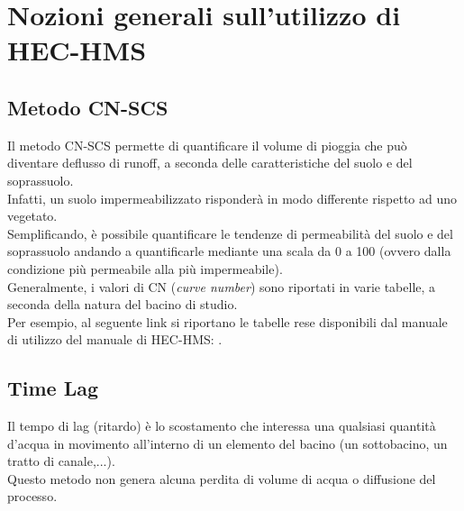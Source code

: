 \section{Nozioni generali sull'utilizzo di HEC-HMS}
\subsection{Metodo CN-SCS}
Il metodo CN-SCS permette di quantificare il volume di pioggia che può diventare deflusso di runoff, a seconda delle caratteristiche del suolo e del soprassuolo.\\
Infatti, un suolo impermeabilizzato risponderà in modo differente rispetto ad uno vegetato.\\
Semplificando, è possibile quantificare le tendenze di permeabilità del suolo e del soprassuolo andando a quantificarle mediante una scala da 0 a 100 (ovvero dalla condizione più permeabile alla più impermeabile).\\
Generalmente, i valori di CN (\textit{curve number}) sono riportati in varie tabelle, a seconda della natura del bacino di studio.\\
Per esempio, al seguente link si riportano le tabelle rese disponibili dal manuale di utilizzo del manuale di HEC-HMS: \cite{cn_tables_hec_hms}.

\subsection{Time Lag}
Il tempo di lag (ritardo) è lo scostamento che interessa una qualsiasi quantità d'acqua in movimento all'interno di un elemento del bacino (un sottobacino, un tratto di canale,...).\\
Questo metodo non genera alcuna perdita di volume di acqua o diffusione del processo. 